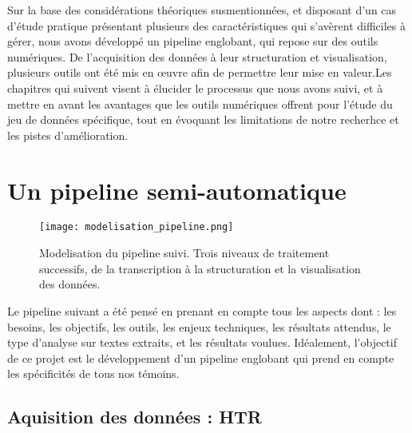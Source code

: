 \documentclass[a4paper, twoside, 12pt]{book}
\begin{document}
Sur la base des considérations théoriques susmentionnées, et disposant d'un cas d'étude pratique présentant plusieurs des caractéristiques qui s'avèrent difficiles à gérer, nous avons développé un pipeline englobant, qui repose sur des outils numériques. De l'acquisition des données à leur structuration et visualisation, plusieurs outils ont été mis en œuvre afin de permettre leur mise en valeur.Les chapitres qui suivent visent à élucider le processus que nous avons suivi, et à mettre en avant les avantages que les outils numériques offrent pour l'étude du jeu de données spécifique, tout en évoquant les limitations de notre recherhce et les pistes d'amélioration.

\chapter{Un pipeline semi-automatique}

\begin{figure}[H]
    \centering
    \texttt{[image: modelisation\_pipeline.png]}
    \caption{Modelisation du pipeline suivi. Trois niveaux de traitement successifs, de la transcription à la structuration et la visualisation des données.}
\end{figure}

Le pipeline suivant a été pensé en prenant en compte tous les aspects dont : les besoins, les objectifs, les outils, les enjeux techniques, les résultats attendus, le type d’analyse sur textes extraits, et les résultats voulues. Idéalement, l'objectif de ce projet est le développement d'un pipeline englobant qui prend en compte les spécificités de tous nos témoins.

\section{Aquisition des données : HTR}
\end{document}
